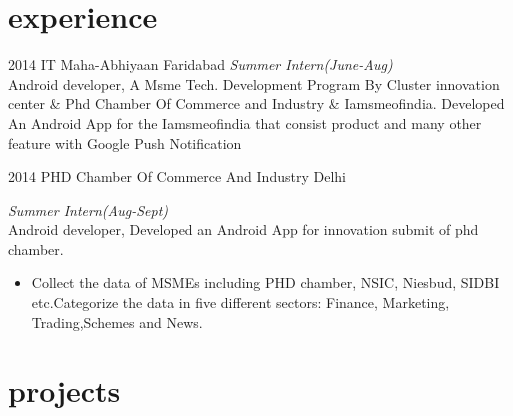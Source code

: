 \documentclass[]{friggeri-cv}
\begin{document}
\section{experience}

\begin{entrylist}
  \entry
    {2014}
    {IT Maha-Abhiyaan}
    {Faridabad}
    {\emph{Summer Intern(June-Aug)}\\ Android developer, A Msme Tech. Development Program By Cluster innovation center \& Phd Chamber Of Commerce and Industry \& Iamsmeofindia. \newline Developed An Android App for the Iamsmeofindia that consist product and many other feature with Google Push Notification}

  \entry
    {2014}
    {PHD Chamber Of Commerce And Industry}
    {Delhi}
    {\emph{Summer Intern(Aug-Sept)}\\ Android developer, Developed an Android App for innovation submit of phd chamber. \begin{itemize}
    \item Collect the data of MSMEs including PHD chamber, NSIC, Niesbud, SIDBI etc.Categorize the data in five different sectors: Finance, Marketing, Trading,Schemes and News.
    \end{itemize}}
   
\end{entrylist} 

\section{projects}
\end{document}

